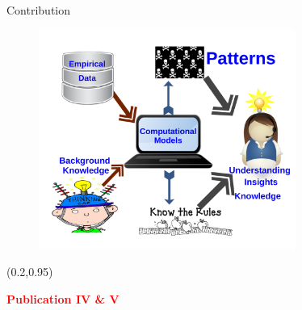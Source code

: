 \documentclass[first=dgreen,second=purple,logo=redexc]{aaltoslides}
\makeatletter
\newcommand{\fq@author}{}
\newcommand*{\fqsource}[1]{\gdef\fq@source{#1}}
\newenvironment{fquote}[1][]{%
\def\fq@author{#1}%
\let\fq@source\@empty
  \vspace{1em}
  \begin{list}{}{%
      \setlength{\leftmargin}{0.2\textwidth}
      \setlength{\rightmargin}{0.2\textwidth}
    }
    \item[]%
    \begin{picture}(0,0)(0,0)
      \put(-15,-5){\makebox(0,0){%
	  \scalebox{5}{\textcolor{quotemark}{\bfseries``}}}%
      }
    \end{picture}\em\ignorespaces%
}{%
  \newline%
  \makebox[0pt][l]{\hspace{0.6\textwidth}%
  \begin{picture}(0,0)(0,0)
    \put(15,10){\makebox(0,0){%
	\scalebox{5}{\textcolor{quotemark}{\rm\bfseries''}}}%
    }
  \end{picture}}%
  \ifx\fq@author\@empty\else\hfill\textsc{--- \fq@author}\fi
  \ifx\fq@source\@empty\else\\\mbox{}\hfill\textsl{\small\fq@source}\fi
  \end{list}
  \ifx\fq@author\@empty\else\vspace{1em}\fi
}
\newcommand\FrameText[1]{%
  \begin{textblock*}{0.98\textwidth}(0.2\textwidth,0.95\textheight)
    \textcolor {red}{\scriptsize\raggedright #1\hspace{0.1\textwidth}}
  \end{textblock*}}
\makeatother
\begin{document}
  \begin{frame}{Contribution}
 \begin{figure}
 \centering
   \includegraphics[trim=0cm 0cm 0cm 0cm, clip=true,width=0.75\textwidth]{figures/patterns}
 \end{figure}
 \FrameText{\textbf{Publication IV \& V}}
 \end{frame}
% 
%       
% 
% 
% 
% 

\end{document}
